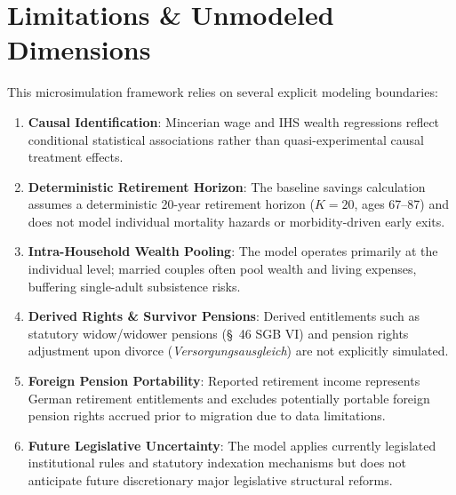 \documentclass[conference]{IEEEtran}
\begin{document}
\section{Limitations \& Unmodeled Dimensions}
This microsimulation framework relies on several explicit modeling boundaries:
\begin{enumerate}
    \item \textbf{Causal Identification}: Mincerian wage and IHS wealth regressions reflect conditional statistical associations rather than quasi-experimental causal treatment effects.
    \item \textbf{Deterministic Retirement Horizon}: The baseline savings calculation assumes a deterministic 20-year retirement horizon ($K=20$, ages 67--87) and does not model individual mortality hazards or morbidity-driven early exits.
    \item \textbf{Intra-Household Wealth Pooling}: The model operates primarily at the individual level; married couples often pool wealth and living expenses, buffering single-adult subsistence risks.
    \item \textbf{Derived Rights \& Survivor Pensions}: Derived entitlements such as statutory widow/widower pensions (\S~46 SGB VI) and pension rights adjustment upon divorce (\textit{Versorgungsausgleich}) are not explicitly simulated.
    \item \textbf{Foreign Pension Portability}: Reported retirement income represents German retirement entitlements and excludes potentially portable foreign pension rights accrued prior to migration due to data limitations.
    \item \textbf{Future Legislative Uncertainty}: The model applies currently legislated institutional rules and statutory indexation mechanisms but does not anticipate future discretionary major legislative structural reforms.
\end{enumerate}
\end{document}
